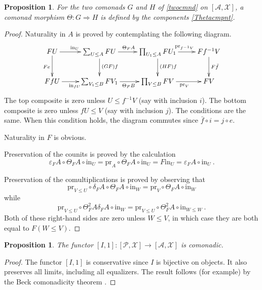 \documentclass[a4paper,12pt,reqno]{amsart}
\newtheorem{proposition}[theorem]{Proposition}
\theoremstyle{definition}
\theoremstyle{fact}
\theoremstyle{genquest}
\theoremstyle{step}
\newcommand{\lra}{\longrightarrow}
\def\CA{{\mathscr A}}
\def\CP{{\mathscr P}}
\def\CX{{\mathscr X}}
\begin{document}
\begin{proposition}
For the two comonads $G$ and $H$ of \eqref{twocmnd} on $[\CA,\CX]$, a comonad morphism $\Theta : G \Rightarrow H$ is defined by the components \eqref{Thetacmpnt}.
\end{proposition}
\begin{proof}
Naturality in $A$ is proved by contemplating the following diagram.
\begin{equation*}
\xymatrix{
FU \ar[d]_{Fe}\ar[r]^{\mathrm{in}_U \ }  & \sum_{U\le A}{FU}\ar[d]^{(GF)f} \ar[r]^{\Theta_FA} & \prod_{U_1\le A}{FU_1} \ar[d]^{(HF)f} \ar[r]^{ \ \mathrm{pr}_{f^{-1}V}} 
& Ff^{-1}V \ar[d]^{F\bar{f}} \\
FfU\ar[r]_{\mathrm{in}_{fU} \ }  & \sum_{V_1\le B}{FV_1}\ar[r]_{\Theta_FB} & \prod_{V\le B}{FV}\ar[r]_{ \ \mathrm{pr}_V} 
& FV }
\end{equation*}
The top composite is zero unless $U\le f^{-1}V$ (say with inclusion $i$). 
The bottom composite is zero unless $fU\le V$ (say with inclusion $j$). 
The conditions are the same.
When this condition holds, the diagram commutes since $\bar{f} \circ i = j \circ e$.  

Naturality in $F$ is obvious. 

Preservation of the counits is proved by the calculation
$$\varepsilon_FA\circ \Theta_FA \circ \mathrm{in}_U = \mathrm{pr}_A\circ \Theta_FA \circ \mathrm{in}_U
= F\mathrm{in}_U = \varepsilon_FA\circ \mathrm{in}_U \ .$$ 

Preservation of the comultiplications is proved by observing that 
$$\mathrm{pr}_{V\le U} \circ \delta_FA \circ \Theta_FA \circ \mathrm{in}_W
= \mathrm{pr}_{V} \circ \Theta_FA \circ \mathrm{in}_W$$
while
$$\mathrm{pr}_{V\le U} \circ \Theta^2_FA \delta_FA  \circ \mathrm{in}_W
= \mathrm{pr}_{V\le U} \circ \Theta^2_FA \circ \mathrm{in}_{W\le W} \ .$$
Both of these right-hand sides are zero unless $W\le V$, in which case they
are both equal to $F(W\le V)$. 
\end{proof}

\begin{proposition}
The functor $[I,1] : [\CP,\CX]\lra [\CA,\CX]$ is comonadic.
\end{proposition}
\begin{proof}
The functor $[I,1]$ is conservative since $I$ is bijective on objects.
It also preserves all limits, including all equalizers.
The result follows (for example) by the Beck comonadicity theorem \cite{ML1963}.
\end{proof}
\end{document}
